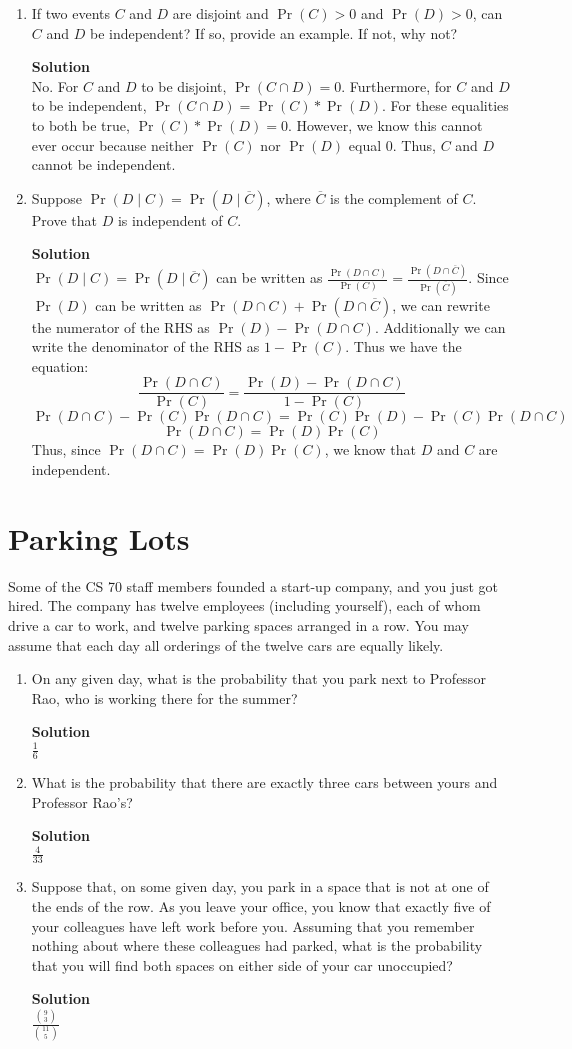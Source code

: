 \documentclass[11pt]{article}
\newcommand*{\Question}[1]{\section{#1}}
\newenvironment{Parts}{\begin{enumerate}[label=(\alph*)]}{\end{enumerate}}
\newcommand*{\Part}{\item}
\newenvironment{Answer}{\vspace{10pt}\begin{mdframed}\textbf{Solution}\\}{\end{mdframed}\vfill\pagebreak[3]}
\newenvironment{Answer}{\vspace{10pt}}{\vfill\pagebreak[3]}
\begin{document}
\begin{Parts}
\Part If two events $C$ and $D$ are disjoint and $\Pr(C) > 0$ and $\Pr(D) > 0$, can $C$ and $D$ be independent? If so, provide an example. If not, why not?
\begin{Answer}
    No. For $C$ and $D$ to be disjoint, $\Pr(C \cap D)=0$. Furthermore, for $C$ and $D$ to be independent, $\Pr(C \cap D)=\Pr(C)*\Pr(D)$. For these equalities to both be true, $\Pr(C)*\Pr(D)=0$. However, we know this cannot ever occur because neither $\Pr(C)$ nor $\Pr(D)$ equal 0. Thus, $C$ and $D$ cannot be independent. 
\end{Answer}

\Part Suppose $\Pr(D \mid C) = \Pr(D \mid \overline{C})$, where $\overline{C}$ is the complement of $C$. Prove that $D$ is independent of $C$.
\begin{Answer}
     $\Pr(D \mid C) = \Pr(D \mid \overline{C})$ can be written as $\frac{\Pr(D \cap C)}{\Pr(C)}=\frac{\Pr(D \cap \overline{C})}{\Pr(\overline{C})}$. Since $\Pr(D)$ can be written as $\Pr(D \cap C)+\Pr(D \cap \overline{C})$, we can rewrite the numerator of the RHS as $\Pr(D)-\Pr(D \cap C)$. Additionally we can write the denominator of the RHS as $1-\Pr(C)$. Thus we have the equation: $$\frac{\Pr(D \cap C)}{\Pr(C)}=\frac{\Pr(D)-\Pr(D \cap C)}{1-\Pr(C)}$$ $$\Pr(D \cap C)-\Pr(C)\Pr(D \cap C)=\Pr(C)\Pr(D)-\Pr(C)\Pr(D \cap C)$$ $$\Pr(D \cap C)= \Pr(D)\Pr(C)$$ Thus, since $\Pr(D \cap C)= \Pr(D)\Pr(C)$, we know that $D$ and $C$ are independent.
\end{Answer}

\end{Parts}

\Question{Parking Lots}

Some of the CS 70 staff members founded a start-up company, and you just got hired.
The company has twelve employees (including yourself), each of whom drive a car to work, 
and twelve parking spaces arranged in a row. You may assume that each day all orderings 
of the twelve cars are equally likely.

\begin{Parts}

\Part On any given day, what is the probability that you park next to Professor Rao, 
who is working there for the summer?
\begin{Answer}
    $\frac{1}{6}$
\end{Answer}

\Part What is the probability that there are exactly three cars between yours
and Professor Rao's?
\begin{Answer}
    $\frac{4}{33}$
\end{Answer}

\Part Suppose that, on some given day, you park in a space that is not at one of
the ends of the row.  As you leave your office, you know that exactly five of
your colleagues have left work before you.  Assuming that you remember nothing
about where these colleagues had parked, what is the probability that you will
find both spaces on either side of your car unoccupied?
\begin{Answer}
    $\frac{\binom{9}{3}}{\binom{11}{5}}$
\end{Answer}
\end{Parts}
\end{document}
